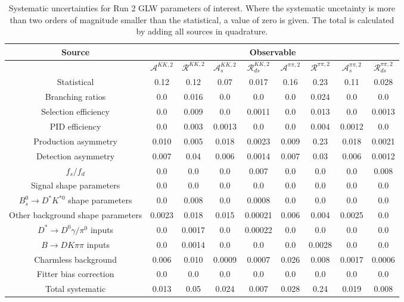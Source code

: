 \begin{sidewaystable}
  \centering
  \begin{tabular}{ccccccccc}
      \toprule
      Source & \multicolumn{8}{c}{Observable} \\
      \midrule
       & $\mathcal{A}^{KK,2}$ & $\mathcal{R}^{KK,2}$ & $\mathcal{A}_s^{KK,2}$ & $\mathcal{R}_{ds}^{KK,2}$ & $\mathcal{A}^{\pi\pi,2}$ & $\mathcal{R}^{\pi\pi,2}$ & $\mathcal{A}_s^{\pi\pi,2}$ & $\mathcal{R}_{ds}^{\pi\pi,2}$ \\
      \midrule
      Statistical & 0.12 & 0.12 & 0.07 & 0.017 & 0.16 & 0.23 & 0.11 & 0.028 \\
      \midrule
      Branching ratios & 0.0  & 0.016 & 0.0  & 0.0  & 0.0  & 0.024 & 0.0  & 0.0  \\
      Selection efficiency & 0.0  & 0.009 & 0.0  & 0.0011 & 0.0  & 0.013 & 0.0  & 0.0013 \\
      PID efficiency & 0.0  & 0.003 & 0.0013 & 0.0  & 0.0  & 0.004 & 0.0012 & 0.0  \\
      Production asymmetry & 0.010 & 0.005 & 0.018 & 0.0023 & 0.009 & 0.23 & 0.018 & 0.0021 \\
      Detection asymmetry & 0.007 & 0.04 & 0.006 & 0.0014 & 0.007 & 0.03 & 0.006 & 0.0012 \\
      $f_s/f_d$ & 0.0  & 0.0  & 0.0  & 0.007 & 0.0  & 0.0  & 0.0  & 0.008 \\
      Signal shape parameters & 0.0  & 0.0  & 0.0  & 0.0  & 0.0  & 0.0  & 0.0  & 0.0  \\
      $B^0_s \to D^* K^{*0}$ shape parameters & 0.0  & 0.008 & 0.0  & 0.0008 & 0.0  & 0.0  & 0.0  & 0.0  \\
      Other background shape parameters & 0.0023 & 0.018 & 0.015 & 0.00021 & 0.006 & 0.004 & 0.0025 & 0.0  \\
      $D^* \to D^0 \gamma/\pi^0$ inputs & 0.0  & 0.0017 & 0.0  & 0.00022 & 0.0  & 0.0  & 0.0  & 0.0  \\
      $B\to DK\pi\pi$ inputs & 0.0  & 0.0014 & 0.0  & 0.0  & 0.0  & 0.0028 & 0.0  & 0.0  \\
      Charmless background & 0.006 & 0.010 & 0.0009 & 0.0007 & 0.026 & 0.008 & 0.0017 & 0.0006 \\
      Fitter bias correction & 0.0  & 0.0  & 0.0  & 0.0  & 0.0  & 0.0  & 0.0  & 0.0  \\
      \midrule
      Total systematic & 0.013 & 0.05 & 0.024 & 0.007 & 0.028 & 0.24 & 0.019 & 0.008 \\
      \bottomrule
  \end{tabular}
  \caption{Systematic uncertainties for Run 2 GLW parameters of interest. Where the systematic uncetainty is more than two orders of magnitude smaller than the statistical, a value of zero is given. The total is calculated by adding all sources in quadrature.}
\label{tab:KK_run2_systematics}
\end{sidewaystable}
